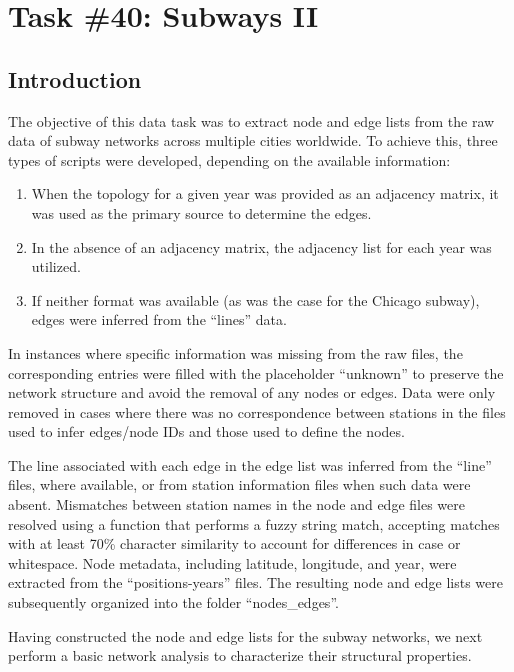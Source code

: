 \chapter{Task \#40: Subways II}


\section{Introduction}


The objective of this data task was to extract node and edge lists from the raw data of subway networks across multiple cities worldwide. To achieve this, three types of scripts were developed, depending on the available information:

\begin{enumerate}
    \item When the topology for a given year was provided as an adjacency matrix, it was used as the primary source to determine the edges.
    \item In the absence of an adjacency matrix, the adjacency list for each year was utilized.
    \item If neither format was available (as was the case for the Chicago subway), edges were inferred from the ``lines'' data.
\end{enumerate}

In instances where specific information was missing from the raw files, the corresponding entries were filled with the placeholder ``unknown'' to preserve the network structure and avoid the removal of any nodes or edges. Data were only removed in cases where there was no correspondence between stations in the files used to infer edges/node IDs and those used to define the nodes.  

The line associated with each edge in the edge list was inferred from the ``line'' files, where available, or from station information files when such data were absent. Mismatches between station names in the node and edge files were resolved using a function that performs a fuzzy string match, accepting matches with at least 70\% character similarity to account for differences in case or whitespace. Node metadata, including latitude, longitude, and year, were extracted from the ``positions-years'' files.  
The resulting node and edge lists were subsequently organized into the folder ``nodes\_edges''.

Having constructed the node and edge lists for the subway networks, we next perform a basic network analysis to characterize their structural properties.




